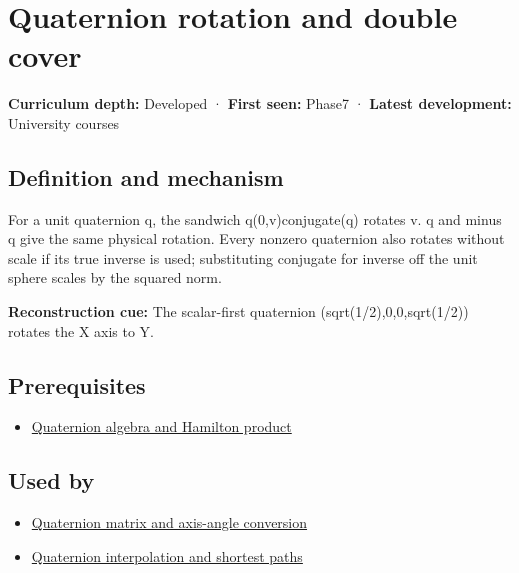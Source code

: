 \hypertarget{appendix-8e61ab68f6b2}{}\label{referencestart:appendix-8e61ab68f6b2}
\section{Quaternion rotation and double cover}\label{appendix-8e61ab68f6b2-quaternion-rotation-and-double-cover}

\textbf{Curriculum depth:} Developed · \textbf{First seen:} Phase7 · \textbf{Latest development:} University courses

\begin{allmightroledefinition}

\subsection{Definition and mechanism}\label{appendix-8e61ab68f6b2-definition-and-mechanism}

For a unit quaternion q, the sandwich q(0,v)conjugate(q) rotates v. q and minus q give the same physical rotation. Every nonzero quaternion also rotates without scale if its true inverse is used; substituting conjugate for inverse off the unit sphere scales by the squared norm.

\end{allmightroledefinition}

\textbf{Reconstruction cue:} The scalar-first quaternion (sqrt(1/2),0,0,sqrt(1/2)) rotates the X axis to Y.

\subsection{Prerequisites}\label{appendix-8e61ab68f6b2-prerequisites}

\begin{itemize}
\tightlist
\item
  \hyperref[appendix-965d9260eeab]{Quaternion algebra and Hamilton product}
\end{itemize}

\subsection{Used by}\label{appendix-8e61ab68f6b2-used-by}

\begin{itemize}
\tightlist
\item
  \hyperref[appendix-26d8da71f6c4]{Quaternion matrix and axis-angle conversion}
\item
  \hyperref[appendix-9b4b8254f26b]{Quaternion interpolation and shortest paths}
\end{itemize}

